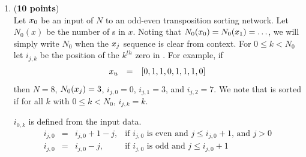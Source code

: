 \documentclass{article}
\begin{document}
\begin{enumerate}
\begin{enumerate}
\begin{itemize}
                        \item When $j$ is even, for each \emph{odd} integer $i$ with $0 \leq i < N$,
                              \begin{displaymath}\begin{array}{rcl}
                                      \xji{j+1}{i}   & = & \min(\xji{j}{i}, \xji{j}{i+1}) \\
                                      \xji{j+1}{i+1} & = & \max(\xji{j}{i}, \xji{j}{i+1})
                                  \end{array}\end{displaymath}
                    \end{itemize}
                    If you need more hints, run  trying various lists for 
                    with one  and the rest .  And then drop by office hours or post questions to piazza.
              \item (\textbf{10 points})\label{q:sort.induct}\\
                    Let $x_{0}$ be an input of $N$ to an odd-even transposition sorting network.
                    Let $N_0(x)$ be the number of s in $x$.
                    Noting that $N_0(x_{0}) = N_0(x_{1}) = \ldots$, we will simply write $N_0$ when the
                    $x_{j}$ sequence is clear from context.
                    For $0 \leq k < N_0$ let $i_{j,k}$ be the position of the $k^{th}$ zero in .
                    For example, if
                    \begin{displaymath}\begin{array}{rcl}
                            x_{u} & = & [0,1,1,0,1,1,1,0]
                        \end{array}\end{displaymath}
                    then $N=8$, $N_0(x_{j}) = 3$, $i_{j,0} = 0$, $i_{j,1} = 3$, and $i_{j,2} = 7$.
                    We note that  is sorted if for all $k$ with $0 \leq k < N_0$, $i_{j,k} = k$.
                    \par
                    $i_{0,k}$ is defined from the input data.
                    \begin{displaymath}\begin{array}{rcll}
                            i_{j,0} & = & i_{j,0} + 1 - j, & \textrm{if $i_{j,0}$ is even and $j \leq i_{j,0} + 1$, and $j > 0$} \\
                            i_{j,0} & = & i_{j,0} - j,     & \textrm{if $i_{j,0}$ is odd and $j \leq i_{j,0} + 1$}               \\

\end{array}
\end{displaymath}
\end{enumerate}
\end{enumerate}
\end{document}
